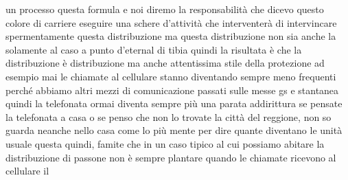 un processo questa formula e noi diremo la responsabilità che dicevo questo colore di carriere eseguire una schere d'attività che interventerà di intervincare spermentamente questa distribuzione ma questa distribuzione non sia anche la solamente al caso a punto d'eternal di tibia quindi la risultata è che la distribuzione è distribuzione ma anche attentissima stile della protezione ad esempio mai le chiamate al cellulare stanno diventando sempre meno frequenti perché abbiamo altri mezzi di comunicazione passati sulle messe gs e stantanea quindi la telefonata ormai diventa sempre più una parata addirittura se pensate la telefonata a casa o se penso che non lo trovate la città del reggione, non so guarda neanche nello casa come lo più mente per dire quante diventano le unità usuale questa quindi, famite che in un caso tipico al cui possiamo abitare la distribuzione di passone non è sempre plantare quando le chiamate ricevono al cellulare il 

